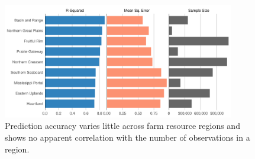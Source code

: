 \documentclass[12pt]{article}
\begin{document}
\begin{figure}[H]
    \centering
    \includegraphics[width=0.9\textwidth]{exhibits/frr_performance_size.png}
    \caption{Prediction accuracy varies little across farm resource regions and shows no apparent correlation with the number of observations in a region.}
    \label{fig:frr_performance_size}
\end{figure}


\newpage

\printbibliography
\end{document}
